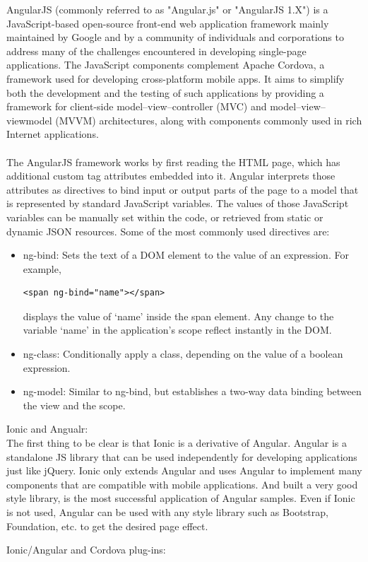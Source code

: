 AngularJS (commonly referred to as "Angular.js" or "AngularJS 1.X") is a JavaScript-based open-source front-end web application framework mainly maintained by Google and by a community of individuals and corporations to address many of the challenges encountered in developing single-page applications\cite{8}. The JavaScript components complement Apache Cordova\cite{5}, a framework used for developing cross-platform mobile apps. It aims to simplify both the development and the testing of such applications by providing a framework for client-side model–view–controller (MVC) and model–view–viewmodel (MVVM) architectures, along with components commonly used in rich Internet applications. \\ \\ The AngularJS framework works by first reading the HTML page\cite{8}, which has additional custom tag attributes embedded into it. Angular interprets those attributes as directives to bind input or output parts of the page to a model that is represented by standard JavaScript variables. The values of those JavaScript variables can be manually set within the code, or retrieved from static or dynamic JSON resources. Some of the most commonly used directives are: 
\begin{itemize}
\item ng-bind: Sets the text of a DOM element to the value of an expression. For example, 
\begin{verbatim}
<span ng-bind="name"></span> 
\end{verbatim}
displays the value of ‘name’ inside the span element. Any change to the variable ‘name’ in the application's scope reflect instantly in the DOM.
\item ng-class: Conditionally apply a class, depending on the value of a boolean expression.
\item ng-model: Similar to ng-bind, but establishes a two-way data binding between the view and the scope.
\end{itemize}
\item Ionic and Angualr: \\ The first thing to be clear is that Ionic is a derivative of Angular. Angular is a standalone JS library that can be used independently for developing applications just like jQuery. Ionic only extends Angular and uses Angular to implement many components that are compatible with mobile applications. And built a very good style library, is the most successful application of Angular samples. Even if Ionic is not used, Angular can be used with any style library such as Bootstrap, Foundation, etc. to get the desired page effect.
\item Ionic/Angular and Cordova plug-ins: \\ 
